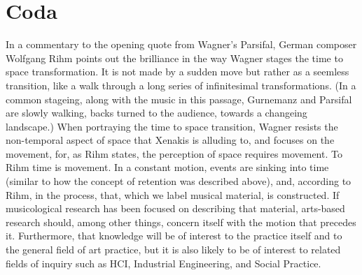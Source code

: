 



\section{Coda}
\label{sec:coda}

In a commentary to the opening quote from Wagner's Parsifal, German composer Wolfgang Rihm points out the brilliance in the way Wagner stages the time to space transformation. It is not made by a sudden move but rather as a seemless transition, like a walk through a long series of infinitesimal transformations. (In a common stageing, along with the music in this passage, Gurnemanz and Parsifal are slowly walking, backs turned to the audience, towards a changeing landscape.) When portraying the time to space transition, Wagner resists the non-temporal aspect of space that Xenakis is alluding to, and focuses on the movement, for, as Rihm states, the perception of space requires movement. \parencite{rihm01} To Rihm time is movement. In a constant motion, events are sinking into time (similar to how the concept of retention was described above), and, according to Rihm, in the process, that, which we label musical material, is constructed. If musicological research has been focused on describing that material, arts-based research should, among other things, concern itself with the motion that precedes it. Furthermore, that knowledge will be of interest to the practice itself and to the general field of art practice, but it is also likely to be of interest to related fields of inquiry such as HCI, Industrial Engineering, and Social Practice.


